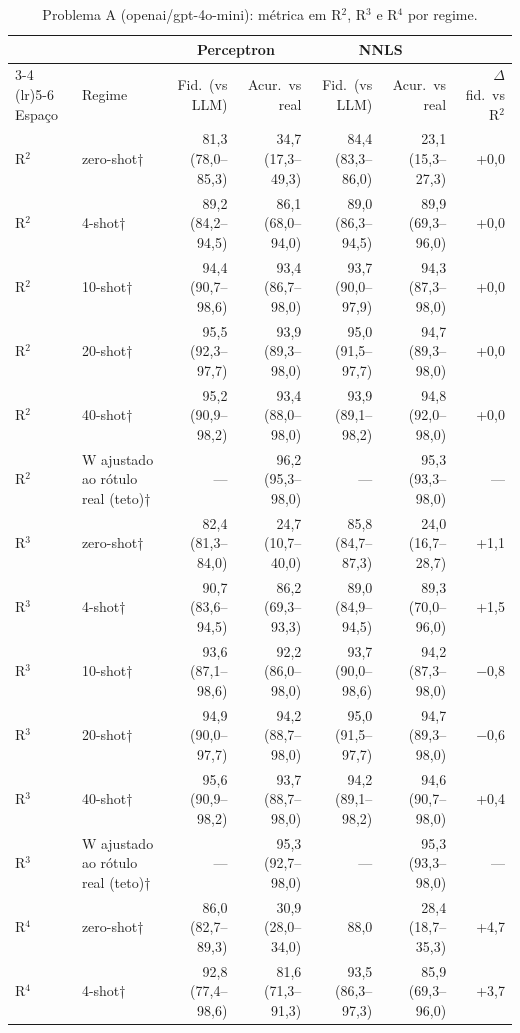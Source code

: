 \begin{table}[htbp]
\centering
\small
\caption{Problema A (openai/gpt-4o-mini): métrica em R$^2$, R$^3$ e R$^4$ por regime.}
\label{tab:bloco1_A_R2_R3_R4_zero_fewshot_gpt4mini}
\begin{tabular}{llrrrrr}
\toprule
 &  & \multicolumn{2}{c}{Perceptron} & \multicolumn{2}{c}{NNLS} &  \\ \cmidrule(lr){3-4} \cmidrule(lr){5-6}
Espaço & Regime & Fid.\ (vs LLM) & Acur.\ vs real & Fid.\ (vs LLM) & Acur.\ vs real & $\Delta$ fid.\ vs R$^2$ \\
\midrule
R$^2$ & zero-shot† & 81,3 (78,0–85,3) & 34,7 (17,3–49,3) & 84,4 (83,3–86,0) & 23,1 (15,3–27,3) & +0,0 \\
R$^2$ & 4-shot† & 89,2 (84,2–94,5) & 86,1 (68,0–94,0) & 89,0 (86,3–94,5) & 89,9 (69,3–96,0) & +0,0 \\
R$^2$ & 10-shot† & 94,4 (90,7–98,6) & 93,4 (86,7–98,0) & 93,7 (90,0–97,9) & 94,3 (87,3–98,0) & +0,0 \\
R$^2$ & 20-shot† & 95,5 (92,3–97,7) & 93,9 (89,3–98,0) & 95,0 (91,5–97,7) & 94,7 (89,3–98,0) & +0,0 \\
R$^2$ & 40-shot† & 95,2 (90,9–98,2) & 93,4 (88,0–98,0) & 93,9 (89,1–98,2) & 94,8 (92,0–98,0) & +0,0 \\
R$^2$ & W ajustado ao rótulo real (teto)† & — & 96,2 (95,3–98,0) & — & 95,3 (93,3–98,0) & — \\
\midrule
R$^3$ & zero-shot† & 82,4 (81,3–84,0) & 24,7 (10,7–40,0) & 85,8 (84,7–87,3) & 24,0 (16,7–28,7) & +1,1 \\
R$^3$ & 4-shot† & 90,7 (83,6–94,5) & 86,2 (69,3–93,3) & 89,0 (84,9–94,5) & 89,3 (70,0–96,0) & +1,5 \\
R$^3$ & 10-shot† & 93,6 (87,1–98,6) & 92,2 (86,0–98,0) & 93,7 (90,0–98,6) & 94,2 (87,3–98,0) & $-$0,8 \\
R$^3$ & 20-shot† & 94,9 (90,0–97,7) & 94,2 (88,7–98,0) & 95,0 (91,5–97,7) & 94,7 (89,3–98,0) & $-$0,6 \\
R$^3$ & 40-shot† & 95,6 (90,9–98,2) & 93,7 (88,7–98,0) & 94,2 (89,1–98,2) & 94,6 (90,7–98,0) & +0,4 \\
R$^3$ & W ajustado ao rótulo real (teto)† & — & 95,3 (92,7–98,0) & — & 95,3 (93,3–98,0) & — \\
\midrule
R$^4$ & zero-shot† & 86,0 (82,7–89,3) & 30,9 (28,0–34,0) & 88,0 & 28,4 (18,7–35,3) & +4,7 \\
R$^4$ & 4-shot† & 92,8 (77,4–98,6) & 81,6 (71,3–91,3) & 93,5 (86,3–97,3) & 85,9 (69,3–96,0) & +3,7 \\

\end{tabular}
\end{table}
